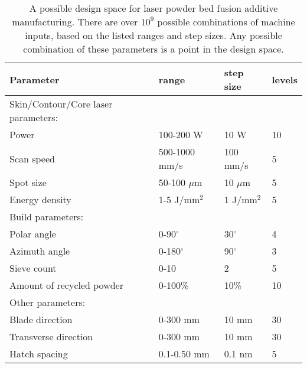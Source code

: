 \begin{table*}[t]
    \renewcommand{\arraystretch}{0.8}
    \setlength{\tabcolsep}{5pt}
    \begin{center}
        \begin{tabular}{@{}llll@{}}
            \toprule
            \hline
             Parameter & range & step size & levels \\ \midrule
            \hline
            \hline
            Skin/Contour/Core laser parameters: & & & \\
            Power & 100-200 W & 10 W & 10 \\
            Scan speed & 500-1000 mm/s & 100 mm/s & 5 \\
            Spot size & 50-100 $\mu$m & 10 $\mu$m & 5 \\
            Energy density & 1-5 J/mm$^2$ & 1 J/mm$^2$ & 5 \\
            \hline
            Build parameters: & & & \\
            Polar angle & 0-90$^\circ$ & 30$^\circ$  & 4 \\
            Azimuth angle & 0-180$^\circ$ & 90$^\circ$  & 3 \\
            Sieve count & 0-10 & 2 & 5 \\
            Amount of recycled powder & 0-100\% & 10\% & 10 \\
            \hline
            Other parameters: & & & \\
            Blade direction & 0-300 mm & 10 mm  & 30 \\
            Transverse direction & 0-300 mm & 10 mm  & 30 \\
            Hatch spacing & 0.1-0.50 mm & 0.1 nm  & 5 \\
            \hline
            \bottomrule
        \end{tabular}
        \caption{A possible design space for laser powder bed fusion additive manufacturing. There are over $10^9$ possible combinations of machine inputs, based on the listed ranges and step sizes. Any possible combination of these parameters is a point in the design space.}
        \label{table:design_space}
    \end{center}
\end{table*}
